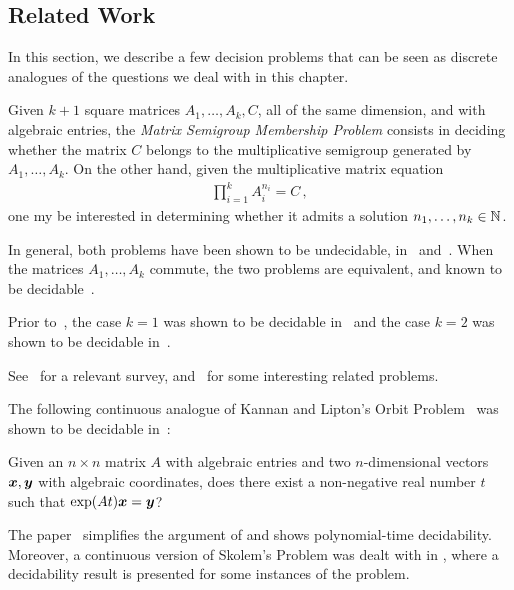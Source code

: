 \subsection{Related Work}
\label{sec:lics_related_work}

In this section, we describe a few decision problems that can be seen as discrete analogues of the questions we deal with in this chapter.

Given $k+1$ square matrices $A_{1}, \ldots, A_{k}, C$, all of the same dimension, and with algebraic entries, the \emph{Matrix Semigroup Membership Problem} consists in deciding whether the matrix $C$ belongs to the multiplicative semigroup generated by $A_{1}, \ldots, A_{k}$.
On the other hand, given the multiplicative matrix equation
\begin{align*}
\prod\limits_{i=1}^{k} A_{i}^{n_{i}} = C \, ,
\end{align*}
one my be interested in determining whether it admits a solution $n_{1}, \ldots, n_{k} \in \mathbb{N}$.

In general, both problems have been shown to be undecidable, in~\cite{Paterson} and~\cite{MEHTP}.
When the matrices $A_{1}, \ldots, A_{k}$ commute, the two problems are
equivalent, and known to be decidable~\cite{MultiplicativeMatrixEquations}.

Prior to~\cite{MultiplicativeMatrixEquations}, the case $k=1$ was shown to be decidable in~\cite{KL86} and the case $k=2$ was shown to be decidable in~\cite{ABC}.

See~\cite{HalavaSurvey} for a relevant survey, and~\cite{CK05} for
some interesting related problems.

The following continuous analogue of Kannan and Lipton's Orbit
Problem~\cite{KL86} was shown to be decidable in~\cite{Hainry08}:

\begin{definition}
Given an $n \times n$ matrix $A$ with algebraic entries and two
$n$-dimensional vectors $\boldsymbol{x}, \boldsymbol{y}$ with
algebraic coordinates, does there exist a non-negative real number $t$ such
that $\exp(At) \boldsymbol{x} = \boldsymbol{y}$?
\end{definition}

The paper~\cite{ContinuousOrbitIPL} simplifies the argument of
\cite{Hainry08} and shows polynomial-time decidability. Moreover, a
continuous version of Skolem's Problem was dealt with in
\cite{ContinuousSkolem}, where a decidability result is presented for
some instances of the problem.

